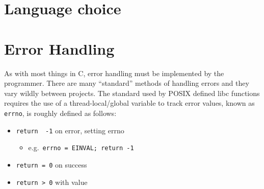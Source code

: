     \section{Language choice}

    \section{Error Handling}
        As with most things in C, error handling must be implemented by the programmer. There are many ``standard'' methods of handling errors and they vary wildly between projects. The standard used by POSIX defined libc functions requires the use of a thread-local/global variable to track error values, known as \texttt{errno}, is roughly defined as follows:
        \begin{center}
            \begin{minipage}{0.88\columnwidth}
                \begin{itemize}[noitemsep]
                    \item{\texttt{return\ \ -1} on error, setting errno}
                        \begin{itemize}
                            \item[]{\small e.g.\ \texttt{errno = EINVAL;\ return -1}}
                        \end{itemize}
                    \item{\texttt{return = 0} on success}
                    \item{\texttt{return > 0} with value}
                \end{itemize}
            \end{minipage}
        \end{center}
        \vspace{\parskip}

